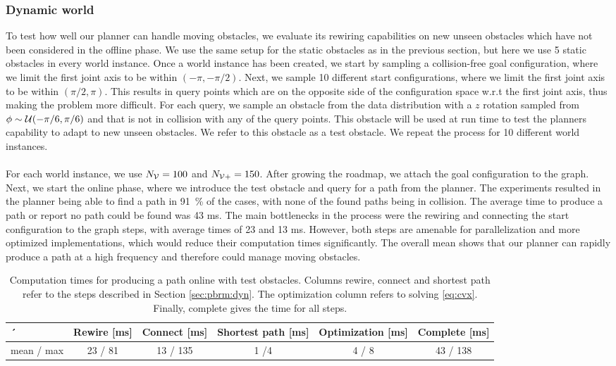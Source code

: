 \documentclass[../main.tex]{subfiles}
\begin{document}
\subsubsection{Dynamic world}
To test how well our planner can handle moving obstacles, we evaluate its rewiring capabilities on new unseen obstacles which have not been considered in the offline phase. We use the same setup for the static obstacles as in the previous section, but here we use 5 static obstacles in every world instance. Once a world instance has been created, we start by sampling a collision-free goal configuration, where we limit the first joint axis to be within $(-\pi, -\pi/2)$. Next, we sample 10 different start configurations, where we limit the first joint axis to be within $(\pi/2, \pi)$. This results in query points which are on the opposite side of the configuration space w.r.t the first joint axis, thus making the problem more difficult. For each query, we sample an obstacle from the data distribution with a $z$ rotation sampled from $\phi \sim \mathcal{U}(-\pi/6, \pi/6)$ and that is not in collision with any of the query points. This obstacle will be used at run time to test the planners capability to adapt to new unseen obstacles. We refer to this obstacle as a test obstacle. We repeat the process for 10 different world instances.
\\\\
For each world instance, we use $N_{\mathcal{V}}=100$ and $N_{\mathcal{V}+}=150$. After growing the roadmap, we attach the goal configuration to the graph. Next, we start the online phase, where we introduce the test obstacle and query for a path from the planner. The experiments resulted in the planner being able to find a path in 91~\% of the cases, with none of the found paths being in collision. The average time to produce a path or report no path could be found was 43 ms. The main bottlenecks in the process were the rewiring and connecting the start configuration to the graph steps, with average times of 23 and 13 ms. However, both steps are amenable for parallelization and more optimized implementations, which would reduce their computation times significantly. The overall mean shows that our planner can rapidly produce a path at a high frequency and therefore could manage moving obstacles.
\iffalse
\begin{table}
\centering
\caption{Computation times for producing a path online with test obstacles. Columns rewire, connect and shortest path refer to the steps described in Section \ref{sec:pbrm:dyn}. The optimization column refers to solving \eqref{eq:cvx}. Finally, complete gives the time for all steps. }
\label{tab:dynamic:results}
\begin{tabular}{l ccccc}
´		& Rewire [ms] & Connect [ms] &  Shortest path [ms] & Optimization [ms] & Complete [ms] \\
\midrule
mean / max    & 23 / 81    &    13 / 135 &   1 /4   &  4 / 8 &  43 / 138 \\
    \bottomrule
\end{tabular}
\end{table}
\end{document}
